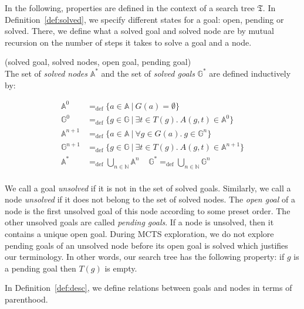 \documentclass[runningheads,a4paper,draft]{svjour3}
\begin{document}
In the following, properties are defined in the context of a
search tree $\mathfrak{T}$. In Definition~\ref{def:solved}, we specify
different states for a goal: open, pending or solved. There, we define
what a solved goal and solved node are by mutual recursion on the number of
steps it takes to solve a goal and a node.
\begin{definition}\label{def:solved}(solved goal, solved nodes, open goal,
pending goal)\\
The set of \textit{solved nodes} $\mathbb{A}^*$ and
the set of \textit{solved goals} $\mathbb{G}^*$ are defined inductively by:

\begin{align*}
\mathbb{A}^{0} &=_{\mathrm{def}}
\lbrace a \in \mathbb{A}\ |\ G(a) = \emptyset \rbrace \\
\mathbb{G}^{0} &=_{\mathrm{def}} \lbrace g \in \mathbb{G}\ |\
\exists t \in T(g).\ A(g,t) \in \mathbb{A}^{0} \rbrace\\
\mathbb{A}^{n+1} &=_{\mathrm{def}} \lbrace a \in \mathbb{A}\ |\
\forall g \in G(a).\ g \in \mathbb{G}^{n} \rbrace\\
\mathbb{G}^{n+1} &=_{\mathrm{def}} \lbrace g \in \mathbb{G}\ |\
\exists t \in T(g).\ A(g,t) \in \mathbb{A}^{n+1} \rbrace \\
\mathbb{A}^* &=_{\mathrm{def}} \bigcup_{n \in \mathbb{N}} \mathbb{A}^n \ \ \ \ \
\mathbb{G}^* =_{\mathrm{def}} \bigcup_{n \in \mathbb{N}} \mathbb{G}^n\\
\end{align*}

We call a goal \textit{unsolved} if it is not in the set
of solved goals. Similarly, we call a node \textit{unsolved} if it does not
belong to the set of solved nodes.
The \textit{open goal} of a node is the first unsolved goal of this node
according to
some preset order. The other unsolved goals are called \textit{pending goals}.
If a node is unsolved, then it contains a unique open goal.
During MCTS exploration, we do not explore pending goals of an unsolved node
before its open goal is solved which justifies our terminology. In other words,
our search tree has the following property: if $g$ is a pending goal then
$T(g)$ is empty.

\end{definition}


In Definition~\ref{def:desc}, we define relations between goals
and nodes in terms of parenthood.
\end{document}
